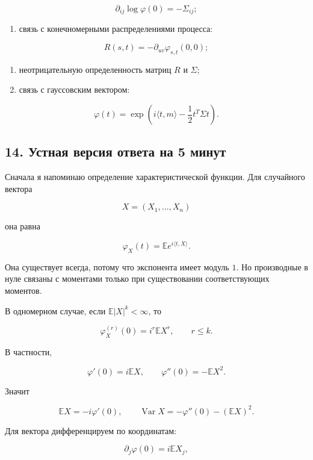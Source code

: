 \documentclass[
  11pt,
  a4paper,
]{article}
\providecommand{\tightlist}{%
  \setlength{\itemsep}{0pt}\setlength{\parskip}{0pt}}
\begin{document}
\[
\partial_{ij}\log\varphi(0)=-\Sigma_{ij};
\]

\begin{enumerate}
\def\labelenumi{\arabic{enumi}.}
\setcounter{enumi}{3}
\tightlist
\item
  связь с конечномерными распределениями процесса:
\end{enumerate}

\[
R(s,t)=-\partial_{uv}\varphi_{s,t}(0,0);
\]

\begin{enumerate}
\def\labelenumi{\arabic{enumi}.}
\setcounter{enumi}{4}
\tightlist
\item
  неотрицательную определенность матриц \(R\) и \(\Sigma\);
\item
  связь с гауссовским вектором:
\end{enumerate}

\[
\varphi(t)=
\exp\left(i\langle t,m\rangle-\frac12t^T\Sigma t\right).
\]

\subsection{14. Устная версия ответа на 5
минут}\label{ux443ux441ux442ux43dux430ux44f-ux432ux435ux440ux441ux438ux44f-ux43eux442ux432ux435ux442ux430-ux43dux430-5-ux43cux438ux43dux443ux442}

Сначала я напоминаю определение характеристической функции. Для
случайного вектора

\[
X=(X_1,\ldots,X_n)
\]

она равна

\[
\varphi_X(t)=\mathbb E e^{i\langle t,X\rangle}.
\]

Она существует всегда, потому что экспонента имеет модуль \(1\). Но
производные в нуле связаны с моментами только при существовании
соответствующих моментов.

В одномерном случае, если \(\mathbb E|X|^k<\infty\), то

\[
\varphi_X^{(r)}(0)=i^r\mathbb EX^r,
\qquad r\le k.
\]

В частности,

\[
\varphi'(0)=i\mathbb EX,
\qquad
\varphi''(0)=-\mathbb EX^2.
\]

Значит

\[
\mathbb EX=-i\varphi'(0),
\qquad
\operatorname{Var}X=-\varphi''(0)-(\mathbb EX)^2.
\]

Для вектора дифференцируем по координатам:

\[
\partial_j\varphi(0)=i\mathbb EX_j,
\]
\end{document}
